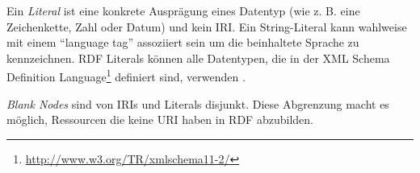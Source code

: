 Ein \textit{Literal} ist eine konkrete Ausprägung eines Datentyp (wie z. B. eine Zeichenkette, Zahl oder Datum) und kein IRI. Ein String-Literal kann wahlweise mit einem \hyphenquote{german}{language tag} assoziiert sein um die beinhaltete Sprache zu kennzeichnen. RDF Literals können alle Datentypen, die in der XML Schema Definition Language\footnote{\url{http://www.w3.org/TR/xmlschema11-2/}} definiert sind, verwenden \parencite[vgl.][Abs. 5]{Wood:14:RCA}. 

\textit{Blank Nodes} sind von IRIs und Literals disjunkt. Diese Abgrenzung macht es möglich, Ressourcen die keine URI haben in RDF abzubilden. 


